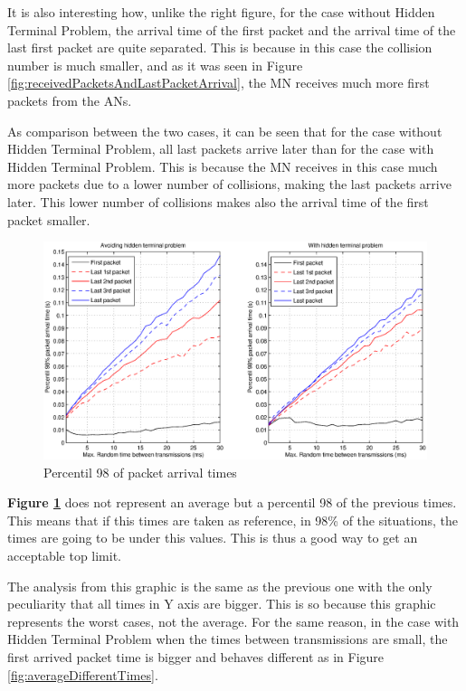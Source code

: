It is also interesting how, unlike the right figure, for the case without Hidden Terminal Problem, the arrival time of the first packet and the arrival 
time of the last first packet are quite separated. This is because in this case the collision number is much smaller, and as it was seen in Figure 
\ref{fig:receivedPacketsAndLastPacketArrival}, the \ac{MN} receives much more first packets from the \acp{AN}.

As comparison between the two cases, it can be seen that for the case without Hidden Terminal Problem, all last packets arrive later than for the
case with Hidden Terminal Problem. This is because the \ac{MN} receives in this case much more packets due to a lower number of collisions, 
making the last packets arrive later. This lower number of collisions makes also the arrival time of the first packet smaller.

\begin{figure}[ht]
 \begin{center}
  \includegraphics[width=1\textwidth]{percentil98differentTimes.eps}
 \end{center}
 \caption{Percentil 98 of packet arrival times}
 \label{fig:percentil98differentTimes}
\end{figure}

\textbf{Figure \ref{fig:percentil98differentTimes}} does not represent an average but a percentil 98 of the previous times. This means that 
if this times are taken as reference, in 98\% of the situations, the times are going to be under this values. This is thus a good way to get 
an acceptable top limit.

The analysis from this graphic is the same as the previous one with the only peculiarity that all times in Y axis are bigger. This is so because
this graphic represents the worst cases, not the average. For the same reason, in the case with Hidden Terminal Problem when the times between
transmissions are small, the first arrived packet time is bigger and behaves different as in Figure \ref{fig:averageDifferentTimes}.

